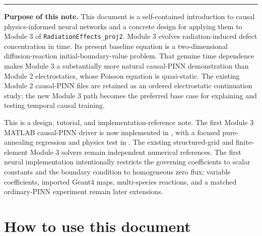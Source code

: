 \documentclass[11pt]{article}
\begin{document}

\hrule
\vspace{0.8em}

\begin{overviewbox}
\textbf{Purpose of this note.} This document is a self-contained introduction to causal physics-informed neural networks and a concrete design for applying them to Module 3 of \texttt{RadiationEffects\_proj2}. Module 3 evolves radiation-induced defect concentration in time. Its present baseline equation is a two-dimensional diffusion-reaction initial-boundary-value problem. That genuine time dependence makes Module 3 a substantially more natural causal-PINN demonstration than Module 2 electrostatics, whose Poisson equation is quasi-static. The existing Module 2 causal-PINN files are retained as an ordered electrostatic continuation study; the new Module 3 path becomes the preferred base case for explaining and testing temporal causal training.

This is a design, tutorial, and implementation-reference note. The first Module 3 MATLAB causal-PINN driver is now implemented in , with a focused pure-annealing regression and physics test in . The existing structured-grid and finite-element Module 3 solvers remain independent numerical references. The first neural implementation intentionally restricts the governing coefficients to scalar constants and the boundary condition to homogeneous zero flux; variable coefficients, imported Geant4 maps, multi-species reactions, and a matched ordinary-PINN experiment remain later extensions.
\end{overviewbox}

\ProjectTOC

\section*{How to use this document}
\end{document}
